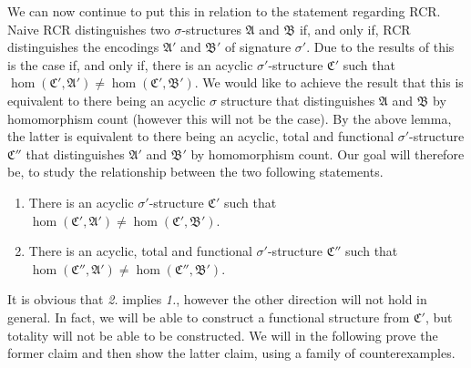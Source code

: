 We can now continue to put this in relation to the statement regarding RCR.
Naive RCR distinguishes two $\sigma$-structures $\mathfrak A$ and $\mathfrak B$ if, and only if, RCR distinguishes the encodings $\mathfrak A'$ and $\mathfrak B'$ of signature $\sigma'$.
Due to the results of \cite{scheidt2025ColorRefinement} this is the case if, and only if, there is an acyclic $\sigma'$-structure $\mathfrak C'$ such that $\hom(\mathfrak C',\mathfrak A')\neq\hom(\mathfrak C',\mathfrak B')$.
We would like to achieve the result that this is equivalent to there being an acyclic $\sigma$ structure that distinguishes $\mathfrak A$ and $\mathfrak B$ by homomorphism count (however this will not be the case).
By the above lemma, the latter is equivalent to there being an acyclic, total and functional $\sigma'$-structure $\mathfrak C''$ that distinguishes $\mathfrak A'$ and $\mathfrak B'$ by homomorphism count.
Our goal will therefore be, to study the relationship between the two following statements.
\begin{enumerate}
	\item There is an acyclic $\sigma'$-structure $\mathfrak C'$ such that $\hom(\mathfrak C',\mathfrak A')\neq\hom(\mathfrak C',\mathfrak B')$.
	\item There is an acyclic, total and functional $\sigma'$-structure $\mathfrak C''$ such that $\hom(\mathfrak C'',\mathfrak A')\neq\hom(\mathfrak C'',\mathfrak B')$.
\end{enumerate}

It is obvious that \emph{2.} implies \emph{1.}, however the other direction will not hold in general.
In fact, we will be able to construct a functional structure from $\mathfrak C'$, but totality will not be able to be constructed.
We will in the following prove the former claim and then show the latter claim, using a family of counterexamples.

